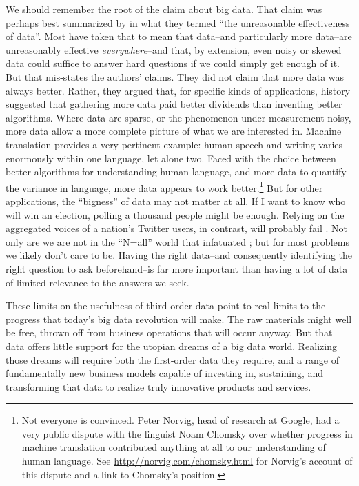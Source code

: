 \documentclass[12pt]{article}
\begin{document}
We should remember the root of the claim about big data. That claim
was perhaps best summarized by \cite{halevy2009unreasonable} in what
they termed ``the unreasonable effectiveness of data''. Most have
taken that to mean that data--and particularly more data--are
unreasonably effective \textit{everywhere}--and that, by extension,
even noisy or skewed data could suffice to answer hard questions if we
could simply get enough of it. But that mis-states the authors'
claims. They did not claim that more data was always better. Rather,
they argued that, for specific kinds
of applications, history suggested that gathering more data paid better
dividends than inventing better algorithms. Where data are sparse, or
the phenomenon under measurement noisy, more data allow a more
complete picture of what we are interested in. Machine translation
provides a very pertinent example: human speech and writing varies
enormously within one language, let alone two. Faced with the choice
between better algorithms for understanding human language, and more
data to quantify the variance in language, more data appears to work
better.\footnote{Not everyone is convinced. Peter Norvig, head of
  research at Google, had a very public dispute with the linguist Noam
Chomsky over whether progress in machine translation contributed
anything at all to our understanding of human language. See
\url{http://norvig.com/chomsky.html} for Norvig's account of this
dispute and a link to Chomsky's position.} But for other applications, the ``bigness'' of data may not matter at
all. If I want to know who will win an election, polling a thousand
people might be enough. Relying on the aggregated voices of a nation's
Twitter users, in contrast, will probably
fail \citep{gayo2011limits,gayo2012wanted,huberty2013}. Not only are we are not
in the ``N=all'' world that infatuated
\cite{mayer2013big}; but for most problems we likely don't
care to be. Having the right data--and consequently identifying the right
question to ask beforehand--is far more important than having a lot of
data of limited relevance to the answers we seek.

These limits on the usefulness of third-order data point to real
limits to the progress that today's big data revolution will make. The
raw materials might well be free, thrown off from business operations
that will occur anyway. But that data offers little support for the
utopian dreams of a big data world. Realizing those dreams will
require both the first-order data they require, and a range of
fundamentally new business models capable of investing in, sustaining,
and transforming that data to realize truly innovative products and
services. 
\end{document}
